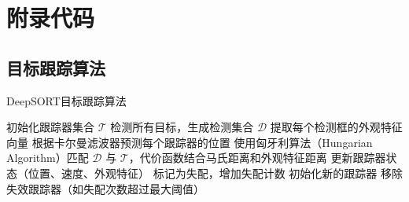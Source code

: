 \chapter{附录代码}

\section{目标跟踪算法}

\begin{algorithm}[h]
    \caption{DeepSORT目标跟踪算法}\label{alg:ovf}
    \begin{algorithmic}[1]
		\STATE 初始化跟踪器集合 $\mathcal{T}$
		    \STATE 检测所有目标，生成检测集合 $\mathcal{D}$
		    \STATE 提取每个检测框的外观特征向量
		    \STATE 根据卡尔曼滤波器预测每个跟踪器的位置
		    \STATE 使用匈牙利算法（Hungarian Algorithm）匹配 $\mathcal{D}$ 与 $\mathcal{T}$，代价函数结合马氏距离和外观特征距离
		        \STATE 更新跟踪器状态（位置、速度、外观特征）
		    \ENDFOR
		        \STATE 标记为失配，增加失配计数
		    \ENDFOR
		        \STATE 初始化新的跟踪器
		    \ENDFOR
		    \STATE 移除失效跟踪器（如失配次数超过最大阈值）
		\ENDFOR
    \end{algorithmic}
\end{algorithm}

